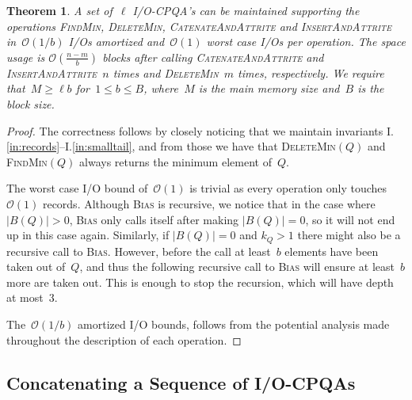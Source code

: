 \documentclass[]{article}
\newcommand{\bigO}{\mathcal{O}}
\newcommand{\iref}[1]{I.\ref{#1}}
\newtheorem{theorem}{Theorem}[section]
\begin{document}
\begin{theorem} \label{thm:iocpqa}
  A set of~$\ell$ I/O-CPQA's can be maintained supporting the operations
  \textsc{FindMin}, \textsc{DeleteMin}, \textsc{CatenateAndAttrite} and
  \textsc{InsertAndAttrite} in~$\bigO(1/b)$ I/Os amortized and~$\bigO(1)$ worst
  case I/Os per operation. The space usage is $\bigO(\frac{n-m}{b}) $ blocks
  after calling \textsc{CatenateAndAttrite} and \textsc{InsertAndAttrite}~$n$
  times and \textsc{DeleteMin}~$m$ times, respectively. We require that~$M \geq
  \ell b$ for~$1 \leq b \leq B$, where~$M$ is the main memory size and~$B$ is
  the block size.
\end{theorem}
\begin{proof}
  The correctness follows by closely noticing that we maintain invariants
  \iref{in:records}--\iref{in:smalltail}, and from those we have that
  \textsc{DeleteMin}$(Q)$ and \textsc{FindMin}$(Q)$ always returns the minimum
  element of~$Q$.

  The worst case I/O bound of~$\bigO(1)$ is trivial as every operation only
  touches~$\bigO(1)$ records. Although \textsc{Bias} is recursive, we notice
  that in the case where $|B(Q)| > 0$, \textsc{Bias} only calls itself after
  making $|B(Q)| = 0$, so it will not end up in this case again. Similarly, if
  $|B(Q)| = 0$ and $k_Q > 1$ there might also be a recursive call to
  \textsc{Bias}. However, before the call at least~$b$ elements have been taken
  out of~$Q$, and thus the following recursive call to \textsc{Bias} will ensure
  at least~$b$ more are taken out. This is enough to stop the recursion, which
  will have depth at most~$3$.
 
  The~$\bigO(1/b)$ amortized I/O bounds, follows from the potential analysis
  made throughout the description of each operation.
\end{proof}

\subsection{Concatenating a Sequence of I/O-CPQAs} \label{ssec:seq} 
\end{document}
